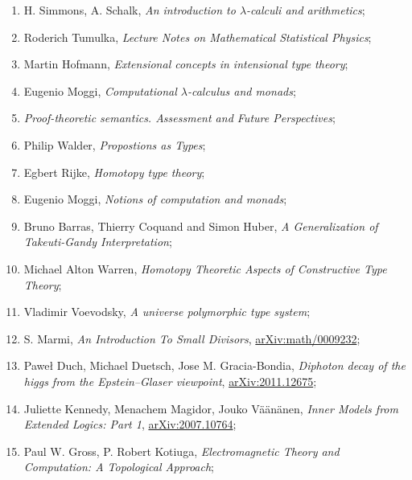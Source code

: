 \documentclass[a4paper,11pt]{article}
\begin{document}
\begin{enumerate}
\item H. Simmons, A. Schalk, \textit{An introduction to
    $\lambda$-calculi and arithmetics};

\item Roderich Tumulka, \textit{Lecture Notes on Mathematical
    Statistical Physics};

\item Martin Hofmann, \textit{Extensional concepts in intensional type
    theory};

\item Eugenio Moggi, \textit{Computational $\lambda$-calculus and monads};

\item \textit{Proof-theoretic semantics. Assessment and Future
    Perspectives};

\item Philip Walder, \textit{Propostions as Types};

\item Egbert Rijke, \textit{Homotopy type theory};

\item Eugenio Moggi, \textit{Notions of computation and monads};

\item Bruno Barras, Thierry Coquand and Simon Huber, \textit{A
    Generalization of Takeuti-Gandy Interpretation};

\item Michael Alton Warren, \textit{Homotopy Theoretic Aspects of
    Constructive Type Theory};

\item Vladimir Voevodsky, \textit{A universe polymorphic type system};

\item S. Marmi, \textit{An Introduction To Small Divisors},
  \href{https://arxiv.org/abs/math/0009232v1}{arXiv:math/0009232};

\item Paweł Duch, Michael Duetsch, Jose M. Gracia-Bondia,
  \textit{Diphoton decay of the higgs from the Epstein--Glaser
    viewpoint},
  \href{https://arxiv.org/abs/2011.12675v2}{arXiv:2011.12675};

\item Juliette Kennedy, Menachem Magidor, Jouko V\"{a}\"{a}n\"{a}nen,
  \textit{Inner Models from Extended Logics: Part 1},
  \href{https://arxiv.org/abs/2007.10764}{arXiv:2007.10764};

\item Paul W. Gross, P. Robert Kotiuga, \textit{Electromagnetic Theory
    and Computation: A Topological Approach};


\end{enumerate}
\end{document}
